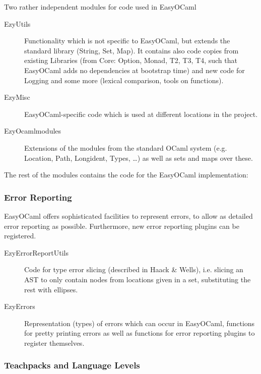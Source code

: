 Two rather independent modules for code used in EasyOCaml

\begin{description}
    \item[EzyUtils] Functionality which is not specific to 
        EasyOCaml, but extends the standard library (String, Set, Map). 
        It contains also code copies from existing Libraries (from Core: 
        Option, Monad, T2, T3, T4, such that EasyOCaml adds no 
        dependencies at bootstrap time) and new code for Logging and 
        some more (lexical comparison, tools on functions).
    \item[EzyMisc] EasyOCaml-specific code which is used at 
        different locations in the project.
    \item[EzyOcamlmodules] Extensions of the modules from the 
        standard OCaml system (e.g. Location, Path, Longident, Types, 
        \ldots{}) as well as sets and maps over these.
\end{description}

The rest of the modules contains the code for the EasyOCaml 
implementation:


\subsubsection{Error Reporting}

EasyOCaml offers sophisticated facilities to represent errors, to allow 
as detailed error reporting as possible.  Furthermore, new error 
reporting plugins can be registered.

\begin{description}
    \item[EzyErrorReportUtils] Code for type error slicing 
        (described in Haack \& Wells), i.e. slicing an AST to only 
        contain nodes from locations given in a set, substituting the 
        rest with ellipses.
    \item[EzyErrors] Representation (types) of errors which can 
        occur in EasyOCaml, functions for pretty printing errors as well 
        as functions for error reporting plugins to register themselves.
\end{description}


\subsubsection{Teachpacks and Language Levels}


